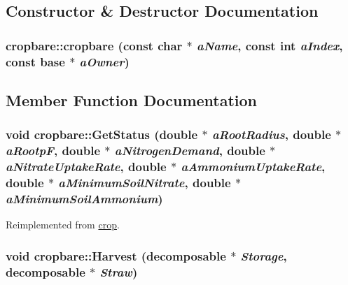 \subsection{Constructor \& Destructor Documentation}
\hypertarget{classcropbare_a6d017192b466eb2f5c9bd9d4ce8df322}{
\subsubsection[{cropbare}]{\setlength{\rightskip}{0pt plus 5cm}cropbare::cropbare (const char $\ast$ {\em aName}, \/  const int {\em aIndex}, \/  const {\bf base} $\ast$ {\em aOwner})}}
\label{classcropbare_a6d017192b466eb2f5c9bd9d4ce8df322}


\subsection{Member Function Documentation}
\hypertarget{classcropbare_a776fa8bf716f23af17ff9c1bb10d1bdc}{
\subsubsection[{GetStatus}]{\setlength{\rightskip}{0pt plus 5cm}void cropbare::GetStatus (double $\ast$ {\em aRootRadius}, \/  double $\ast$ {\em aRootpF}, \/  double $\ast$ {\em aNitrogenDemand}, \/  double $\ast$ {\em aNitrateUptakeRate}, \/  double $\ast$ {\em aAmmoniumUptakeRate}, \/  double $\ast$ {\em aMinimumSoilNitrate}, \/  double $\ast$ {\em aMinimumSoilAmmonium})}}
\label{classcropbare_a776fa8bf716f23af17ff9c1bb10d1bdc}


Reimplemented from \hyperlink{classcrop_a7f8e3691756173129745ea074a076442}{crop}.\hypertarget{classcropbare_ab9e81123fa54843efce5da0861e401f6}{
\subsubsection[{Harvest}]{\setlength{\rightskip}{0pt plus 5cm}void cropbare::Harvest ({\bf decomposable} $\ast$ {\em Storage}, \/  {\bf decomposable} $\ast$ {\em Straw})}}
\label{classcropbare_ab9e81123fa54843efce5da0861e401f6}


